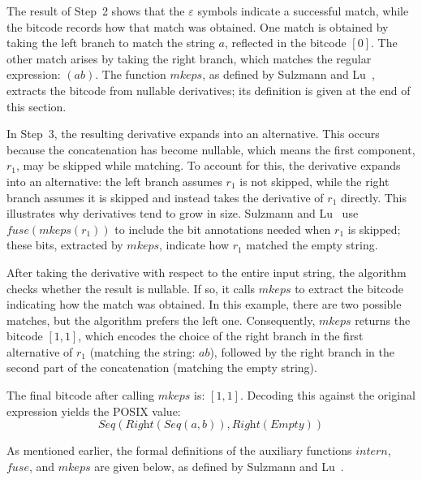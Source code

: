 \documentclass[12pt]{article}
\newcommand{\fuse}{\textit{fuse}}
\newcommand{\mkeps}{\textit{mkeps}}
\newcommand{\intern}{\textit{intern}}
\newcommand{\Seq}{\textit{Seq}}
\newcommand{\Right}{\textit{Right}}
\newcommand{\Empty}{\textit{Empty}}
\begin{document}
The result of Step~2 shows that the $\varepsilon$ symbols indicate a successful match, 
while the bitcode records how that match was obtained. 
One match is obtained by taking the left branch to match the string $a$, reflected in the bitcode $[0]$. 
The other match arises by taking the right branch, which matches the regular expression: $(ab)$. 
The function $\mkeps$, as defined by Sulzmann and Lu~\cite{Sulzmann2014}, extracts the bitcode from nullable derivatives; 
its definition is given at the end of this section.

In Step~3, the resulting derivative expands into an alternative. 
This occurs because the concatenation has become nullable, which means the first component, $r_1$, may be skipped while matching. 
To account for this, the derivative expands into an alternative: the left branch assumes $r_1$ is not skipped, 
while the right branch assumes it is skipped and instead takes the derivative of $r_1$ directly. 
This illustrates why derivatives tend to grow in size. 
Sulzmann and Lu~\cite{Sulzmann2014} use $\fuse(\mkeps(r_1))$ to include the bit annotations needed when $r_1$ is skipped; 
these bits, extracted by $\mkeps$, indicate how $r_1$ matched the empty string.  

After taking the derivative with respect to the entire input string, the algorithm checks whether the result is nullable. 
If so, it calls $\mkeps$ to extract the bitcode indicating how the match was obtained. 
In this example, there are two possible matches, but the algorithm prefers the left one. 
Consequently, $\mkeps$ returns the bitcode $[1,1]$, which encodes the choice of the right branch in the first alternative of $r_1$ 
(matching the string: $ab$), followed by the right branch in the second part of the concatenation (matching the empty string).  

The final bitcode after calling $\mkeps$ is: $[1,1]$. 
Decoding this against the original expression yields the POSIX value:
\[
\Seq(\Right(\Seq(a, b)), \Right(\Empty))
\]

As mentioned earlier, the formal definitions of the auxiliary functions $\intern$, $\fuse$, and $\mkeps$ are given below, 
as defined by Sulzmann and Lu~\cite{Sulzmann2014}.
\end{document}
